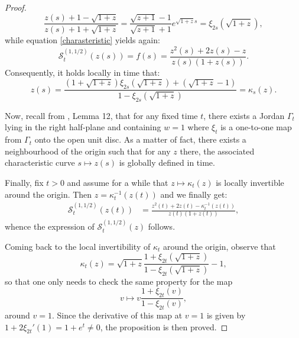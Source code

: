 \documentclass[12pt,reqno]{amsart}
\begin{document}
\begin{proof}
	\begin{equation*}
		\frac{z(s)+1-\sqrt{1+z}}{z(s) + 1+ \sqrt{1+z}} = \frac{\sqrt{z+1}-1}{\sqrt{z + 1} + 1} e^{\sqrt{1+z} s} = \xi_{2s}(\sqrt{1+z}),
	\end{equation*}
	while equation \eqref{charasteristic} yields again:
	\begin{equation*}
		\mathcal{S}_t^{(1,1/2)}(z(s)) = f(s) = \frac{z^2(s) + 2z(s) - z}{z(s)(1+z(s))}.
	\end{equation*}
	Consequently, it holds locally in time that: 
	\begin{equation}\label{KappaMap}
		z(s) = \frac{(1+\sqrt{1+z})\xi_{2s}(\sqrt{1+z}) + (\sqrt{1+z}-1)}{1-\xi_{2s}(\sqrt{1+z})} = \kappa_s(z).
	\end{equation}
	
    Now, recall from \cite{MR1430721}, Lemma 12, that for any fixed time $t$, there exists a Jordan $\Gamma_t$ lying in the right half-plane and containing $w=1$ where $\xi_{t}$ is a one-to-one map from $\Gamma_t$ onto the open unit disc. As a matter of fact, there exists a neighbourhood of the origin such that for any $z$ there, the associated characteristic curve $s \mapsto z(s)$ is globally defined in time. 
    
    Finally, fix $t > 0$ and assume for a while that $z \mapsto \kappa_t(z)$ is locally invertible around the origin. Then $z = \kappa_t^{-1}(z(t))$ and we finally get:
	\begin{align*}
		\mathcal{S}_t^{(1,1/2)}(z(t)) & = \frac{z^2(t) + 2z(t) - \kappa_t^{-1}(z(t))}{z(t)(1+z(t))},
	\end{align*}
    whence the expression of $\mathcal{S}_t^{(1,1/2)}(z)$ follows. 
    
	Coming back to the local invertibility of $\kappa_t$ around the origin, observe that
	\begin{equation*}
		\kappa_t(z) = \sqrt{1+z} \frac{1+\xi_{2t}(\sqrt{1+z})}{1-\xi_{2t}(\sqrt{1+z})} - 1,
	\end{equation*}
	so that one only needs to check the same property for the map
	\begin{equation*}
		v \mapsto v\frac{1+\xi_{2t}(v)}{1-\xi_{2t}(v)},
	\end{equation*}
	around $v=1$. Since the derivative of this map at $v=1$ is given by $1+2\xi_{2t}'(1) = 1+e^t \neq 0$, the proposition is then proved.
\end{proof}
\end{document}
